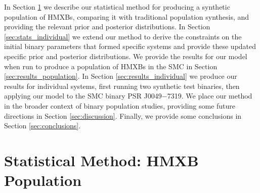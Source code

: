 \documentclass[usenatbib]{mnras}
\begin{document}
In Section \ref{sec:stats_population} we describe our statistical method for producing a synthetic population of HMXBs, comparing it with traditional population synthesis, and providing the relevant prior and posterior distributions. In Section \ref{sec:stats_individual} we extend our method to derive the constraints on the initial binary parameters that formed specific systems and provide these updated specific prior and posterior distributions. We provide the results for our model when run to produce a population of HMXBs in the SMC in Section \ref{sec:results_population}. In Section \ref{sec:results_individual} we produce our results for individual systems, first running two synthetic test binaries, then applying our model to the SMC binary PSR J0049$-$7319. We place our method in the broader context of binary population studies, providing some future directions in Section \ref{sec:discussion}. Finally, we provide some conclusions in Section \ref{sec:conclusions}.

\section{Statistical Method: HMXB Population} \label{sec:stats_population}
\end{document}
